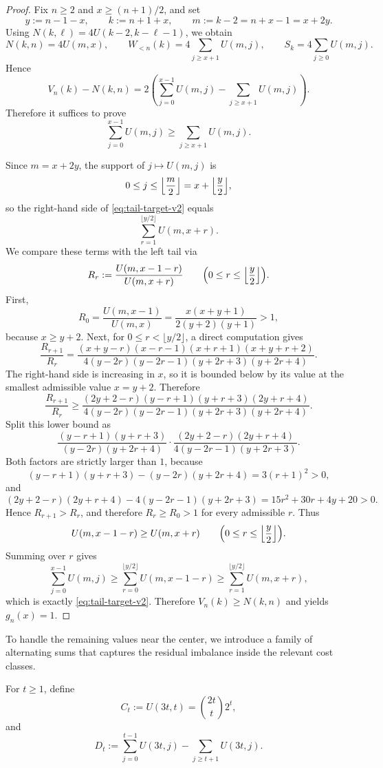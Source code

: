 \documentclass[10pt,a4paper]{article}
\theoremstyle{definition}
\theoremstyle{remark}
\newcommand{\1}{\mathbf{1}}
\begin{document}
\begin{proof}
Fix $n\ge2$ and $x\ge (n+1)/2$, and set
\[
y:=n-1-x,
\qquad
k:=n+1+x,
\qquad
m:=k-2=n+x-1=x+2y.
\]
Using $N(k,\ell)=4U(k-2,k-\ell-1)$, we obtain
\[
N(k,n)=4U(m,x),
\qquad
W_{<n}(k)=4\sum_{j\ge x+1}U(m,j),
\qquad
S_k=4\sum_{j\ge0}U(m,j).
\]
Hence
\[
V_n(k)-N(k,n)
=2\left(\sum_{j=0}^{x-1}U(m,j)-\sum_{j\ge x+1}U(m,j)\right).
\]
Therefore it suffices to prove
\begin{equation}\label{eq:tail-target-v2}
\sum_{j=0}^{x-1}U(m,j)\ge \sum_{j\ge x+1}U(m,j).
\end{equation}

Since $m=x+2y$, the support of $j\mapsto U(m,j)$ is
\[
0\le j\le \Bigl\lfloor\frac m2\Bigr\rfloor=x+\Bigl\lfloor\frac y2\Bigr\rfloor,
\]
so the right-hand side of \eqref{eq:tail-target-v2} equals
\[
\sum_{r=1}^{\lfloor y/2\rfloor}U(m,x+r).
\]
We compare these terms with the left tail via
\[
R_r:=\frac{U(m,x-1-r)}{U(m,x+r)}
\qquad
\Bigl(0\le r\le \Bigl\lfloor\frac y2\Bigr\rfloor\Bigr).
\]
First,
\[
R_0=\frac{U(m,x-1)}{U(m,x)}=\frac{x(x+y+1)}{2(y+2)(y+1)}>1,
\]
because $x\ge y+2$.
Next, for $0\le r<\lfloor y/2\rfloor$, a direct computation gives
\[
\frac{R_{r+1}}{R_r}
=
\frac{(x+y-r)(x-r-1)(x+r+1)(x+y+r+2)}
{4(y-2r)(y-2r-1)(y+2r+3)(y+2r+4)}.
\]
The right-hand side is increasing in $x$, so it is bounded below by its value at the smallest admissible value $x=y+2$. Therefore
\[
\frac{R_{r+1}}{R_r}
\ge
\frac{(2y+2-r)(y-r+1)(y+r+3)(2y+r+4)}
{4(y-2r)(y-2r-1)(y+2r+3)(y+2r+4)}.
\]
Split this lower bound as
\[
\frac{(y-r+1)(y+r+3)}{(y-2r)(y+2r+4)}
\cdot
\frac{(2y+2-r)(2y+r+4)}{4(y-2r-1)(y+2r+3)}.
\]
Both factors are strictly larger than $1$, because
\[
(y-r+1)(y+r+3)-(y-2r)(y+2r+4)=3(r+1)^2>0,
\]
and
\[
(2y+2-r)(2y+r+4)-4(y-2r-1)(y+2r+3)=15r^2+30r+4y+20>0.
\]
Hence $R_{r+1}>R_r$, and therefore $R_r\ge R_0>1$ for every admissible $r$. Thus
\[
U(m,x-1-r)\ge U(m,x+r)
\qquad
\Bigl(0\le r\le \Bigl\lfloor\frac y2\Bigr\rfloor\Bigr).
\]
Summing over $r$ gives
\[
\sum_{j=0}^{x-1}U(m,j)
\ge
\sum_{r=0}^{\lfloor y/2\rfloor}U(m,x-1-r)
\ge
\sum_{r=1}^{\lfloor y/2\rfloor}U(m,x+r),
\]
which is exactly \eqref{eq:tail-target-v2}. Therefore $V_n(k)\ge N(k,n)$ and  yields $g_n(x)=1$.
\end{proof}

To handle the remaining values near the center, we introduce a family of alternating sums that captures the residual imbalance inside the relevant cost classes.

For $t\ge1$, define
\[
C_t:=U(3t,t)=\binom{2t}{t}2^t,
\]
and
\[
D_t:=\sum_{j=0}^{t-1}U(3t,j)-\sum_{j\ge t+1}U(3t,j).
\]
\end{document}
